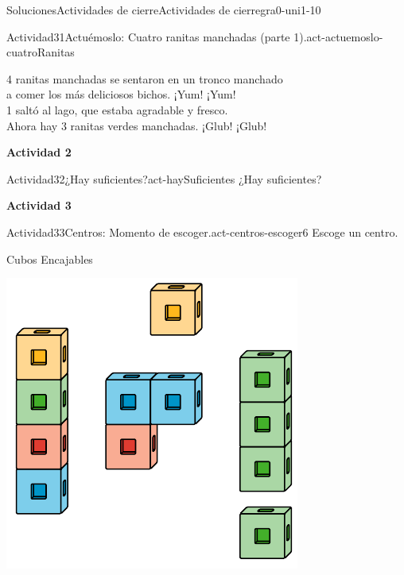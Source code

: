 \documentclass[twoside,10pt,]{article}
\begin{document}
\begin{solutions-section}{Soluciones}{Actividades de cierre}{}{Actividades de cierre}{}{}{gra0-uni1-10}
\begin{activitysolution}{Actividad}{31}{Actuémoslo: Cuatro ranitas manchadas (parte 1).}{act-actuemoslo-cuatroRanitas}
\begin{image}{0.275}{0.45}{0.275}{}
\end{image}%
%
\par
4 ranitas manchadas se sentaron en un tronco manchado\\
 a comer los más deliciosos bichos. ¡Yum! ¡Yum!\\
 1 saltó al lago, que estaba agradable y fresco.\\
 Ahora hay 3 ranitas verdes manchadas. ¡Glub! ¡Glub!%
\end{activitysolution}%
\par\medskip
\noindent\textbf{\large{}\space\textperiodcentered\space{}Actividad 2}
\begin{activitysolution}{Actividad}{32}{¿Hay suficientes?}{act-haySuficientes}%
¿Hay suficientes?%
\end{activitysolution}%
\par\medskip
\noindent\textbf{\large{}\space\textperiodcentered\space{}Actividad 3}
\begin{activitysolution}{Actividad}{33}{Centros: Momento de escoger.}{act-centros-escoger6}%
Escoge un centro.%
\begin{sidebyside}{2}{0.025}{0.025}{0.05}%
\begin{sbspanel}{0.45}%
Cubos Encajables%
\par
\includegraphics[width=\linewidth]{external/svg-source/tikz-file-128850.pdf}

\end{sbspanel}
\end{sidebyside}
\end{activitysolution}
\end{solutions-section}
\end{document}
